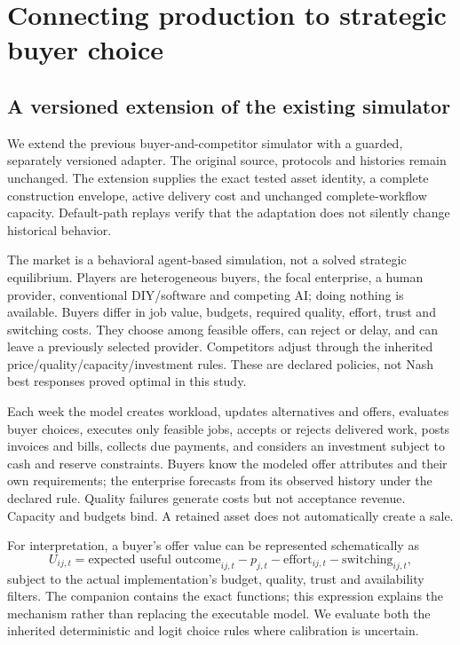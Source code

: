 \documentclass[11pt,a4paper]{article}
\begin{document}
\section{Connecting production to strategic buyer choice}
\subsection{A versioned extension of the existing simulator}
We extend the previous buyer-and-competitor simulator with a guarded, separately versioned adapter. The original source, protocols and histories remain unchanged. The extension supplies the exact tested asset identity, a complete construction envelope, active delivery cost and unchanged complete-workflow capacity. Default-path replays verify that the adaptation does not silently change historical behavior.

The market is a behavioral agent-based simulation, not a solved strategic equilibrium. Players are heterogeneous buyers, the focal enterprise, a human provider, conventional DIY/software and competing AI; doing nothing is available. Buyers differ in job value, budgets, required quality, effort, trust and switching costs. They choose among feasible offers, can reject or delay, and can leave a previously selected provider. Competitors adjust through the inherited price/quality/capacity/investment rules. These are declared policies, not Nash best responses proved optimal in this study.

Each week the model creates workload, updates alternatives and offers, evaluates buyer choices, executes only feasible jobs, accepts or rejects delivered work, posts invoices and bills, collects due payments, and considers an investment subject to cash and reserve constraints. Buyers know the modeled offer attributes and their own requirements; the enterprise forecasts from its observed history under the declared rule. Quality failures generate costs but not acceptance revenue. Capacity and budgets bind. A retained asset does not automatically create a sale.

For interpretation, a buyer's offer value can be represented schematically as
\[
 U_{ij,t}=\text{expected useful outcome}_{ij,t}-p_{j,t}
 -\text{effort}_{ij,t}-\text{switching}_{ij,t},
\]
subject to the actual implementation's budget, quality, trust and availability filters. The companion contains the exact functions; this expression explains the mechanism rather than replacing the executable model. We evaluate both the inherited deterministic and logit choice rules where calibration is uncertain.
\end{document}
